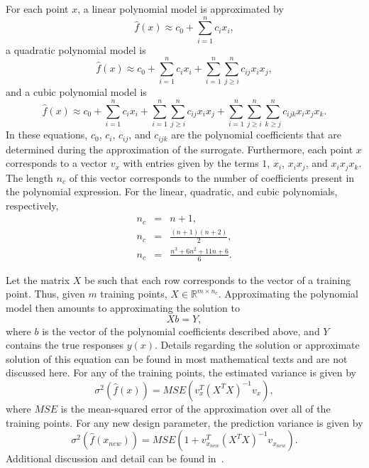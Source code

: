 For each point $x$, a linear polynomial model is approximated by
\begin{equation}
\hat{f}(x) \approx c_0 + \sum_{i = 1}^{n} c_i x_i,
\end{equation}
a quadratic polynomial model is 
\begin{equation}
\hat{f}(x) \approx c_0 + \sum_{i = 1}^{n} c_i x_i + \sum_{i = 1}^{n} 
\sum_{j \geq i}^{n} c_{ij} x_i x_j,
\end{equation}
and a cubic polynomial model is
\begin{equation}
\hat{f}(x) \approx c_0 + \sum_{i = 1}^{n} c_i x_i + \sum_{i = 1}^{n} 
\sum_{j \geq i}^{n} c_{ij} x_i x_j + \sum_{i = 1}^{n} \sum_{j \geq i}^{n}
\sum_{k \geq j}^{n} c_{ijk} x_i x_j x_k.
\end{equation}
In these equations, $c_0$, $c_i$, $c_{ij}$, and $c_{ijk}$ are the polynomial
coefficients that are determined during the approximation of the surrogate. 
Furthermore, each point $x$ corresponds to a vector $v_x$ with entries given 
by the terms $1$, $x_i$, $x_i x_j$, and $x_i x_j x_k$. The length $n_c$ of 
this vector corresponds to the number of coefficients present in the polynomial 
expression. For the linear, quadratic, and cubic polynomials, respectively,
\begin{eqnarray}
n_{c} 	&=& n+1, \\
n_{c} 	&=& \frac{(n+1)(n+2)}{2}, \\
n_{c}	&=& \frac{n^3 + 6n^2 + 11n + 6}{6}.
\end{eqnarray} 

Let the matrix $X$ be such that each row corresponds to the vector of a
training point. Thus, given $m$ training points, $X \in \mathbb{R}^{m \times
n_c}$. Approximating the polynomial model then amounts to approximating the
solution to
\begin{equation}
Xb = Y,
\end{equation} 
where $b$ is the vector of the polynomial coefficients described above, and $Y$
contains the true responses $y(x)$. Details regarding the solution or
approximate solution of this equation can be found in most mathematical texts
and are not discussed here. For any of the training points, the estimated
variance is given by
\begin{equation}
\sigma^{2}\left(\hat{f}(x)\right) = MSE\left(v_x^{T} (X^{T} X)^{-1} v_x\right),
\end{equation} 
where $MSE$ is the mean-squared error of the approximation over all of the
training points. For any new design parameter, the prediction variance is
given by 
\begin{equation}\label{eq:poly_var}
\sigma^{2}\left(\hat{f}(x_{new})\right) = MSE\left(1 + v_{x_{new}}^{T} 
(X^{T} X)^{-1} v_{x_{new}} \right).
\end{equation}
Additional discussion and detail can be found in~\cite{Net85}.



